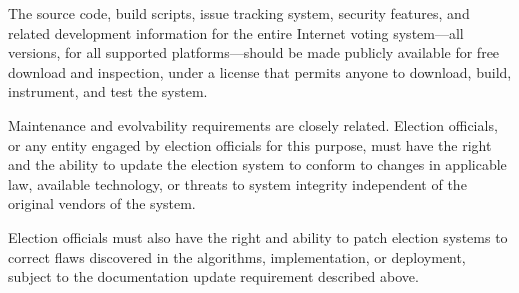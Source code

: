 The source code, build scripts, issue tracking system, security
features, and related development information for the entire Internet
voting system---all versions, for all supported platforms---should be
made publicly available for free download and inspection, under a
license that permits anyone to download, build, instrument, and test
the system.


Maintenance and evolvability requirements are closely
related. Election officials, or any entity engaged by election
officials for this purpose, must have the right and the ability to
update the election system to conform to changes in applicable law,
available technology, or threats to system integrity independent of
the original vendors of the system. 

Election officials must also have the right and ability to patch
election systems to correct flaws discovered in the algorithms,
implementation, or deployment, subject to the documentation update
requirement described above.
